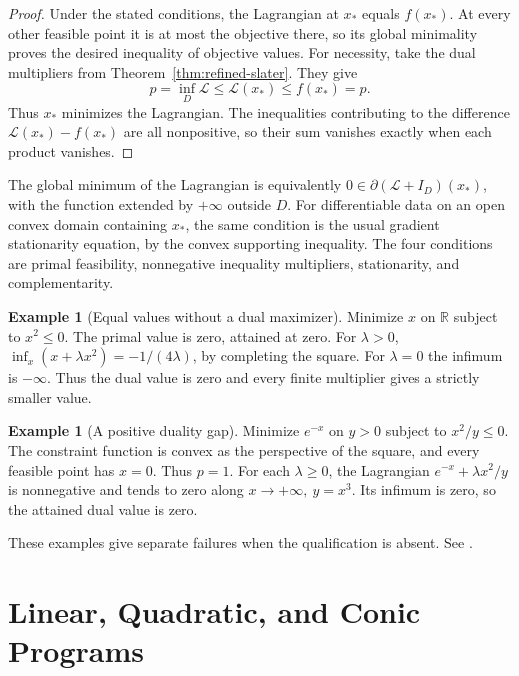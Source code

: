 \documentclass[11pt,oneside,openany]{book}
\newcommand{\R}{\mathbb R}
\theoremstyle{plain}
\theoremstyle{definition}
\newtheorem{example}[theorem]{Example}
\theoremstyle{remark}
\begin{document}
\begin{proof}
Under the stated conditions, the Lagrangian at \(x_*\)
equals \(f(x_*)\). At every other feasible point it is at
most the objective there, so its global minimality
proves the desired inequality of objective values.
For necessity, take the dual multipliers from
Theorem~\ref{thm:refined-slater}. They give
\[
 p=\inf_D\mathcal L\le\mathcal L(x_*)\le f(x_*)=p.
\]
Thus \(x_*\) minimizes the Lagrangian. The inequalities
contributing to the difference \(\mathcal L(x_*)-f(x_*)\)
are all nonpositive, so their sum vanishes exactly
when each product vanishes.
\end{proof}

The global minimum of the Lagrangian is equivalently
\(0\in\partial(\mathcal L+I_D)(x_*)\), with the function
extended by \(+\infty\) outside \(D\).
For differentiable data on an open convex domain containing
\(x_*\), the same condition is the usual gradient
stationarity equation, by the convex supporting inequality.
The four conditions are primal feasibility, nonnegative
inequality multipliers, stationarity, and complementarity.

\begin{example}[Equal values without a dual maximizer]\label{ex:nonattained-dual}
Minimize \(x\) on \(\R\) subject to \(x^2\le0\).
The primal value is zero, attained at zero.
For \(\lambda>0\),
\(\inf_x(x+\lambda x^2)=-1/(4\lambda)\), by completing
the square. For \(\lambda=0\) the infimum is \(-\infty\).
Thus the dual value is zero and every finite multiplier
gives a strictly smaller value.
\end{example}

\begin{example}[A positive duality gap]\label{ex:positive-gap}
Minimize \(e^{-x}\) on \(y>0\) subject to \(x^2/y\le0\).
The constraint function is convex as the perspective of
the square, and every feasible point has \(x=0\).
Thus \(p=1\). For each \(\lambda\ge0\), the Lagrangian
\(e^{-x}+\lambda x^2/y\) is nonnegative and tends to zero
along \(x\to+\infty,\ y=x^3\). Its infimum is zero,
so the attained dual value is zero.
\end{example}

These examples give separate failures when the qualification
is absent. See \cite[Section 5.5 and Exercises 5.21--5.22]{Boyd}.
\chapter{Linear, Quadratic, and Conic Programs}
\end{document}
